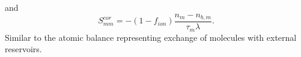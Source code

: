 \documentclass[amsmath,amssymb,a4]{revtex4-2}
\begin{document}
and 
\begin{equation}
    S_{mm}^{cor} = - (1-f_{ion})\frac{n_m-n_{b,m}}{\tau_m\lambda}.
\end{equation}
Similar to the atomic balance representing exchange of molecules with external reservoirs.

\end{document}
